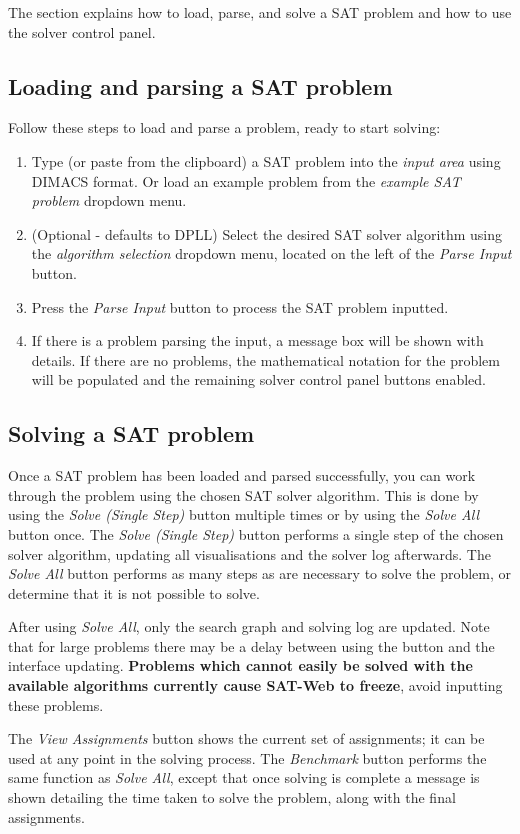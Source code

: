 \documentclass[UKenglish,a4paper]{article}
\begin{document}
The section explains how to load, parse, and solve a SAT problem and how to use the solver control panel.

\subsection{Loading and parsing a SAT problem}

Follow these steps to load and parse a problem, ready to start solving:

\begin{enumerate}
  \item Type (or paste from the clipboard) a SAT problem into the \emph{input area} using DIMACS format. Or load an example problem from the \emph{example SAT problem} dropdown menu.
  \item (Optional - defaults to DPLL) Select the desired SAT solver algorithm using the \emph{algorithm selection} dropdown menu, located on the left of the \emph{Parse Input} button.
  \item Press the \emph{Parse Input} button to process the SAT problem inputted.
  \item If there is a problem parsing the input, a message box will be shown with details. If there are no problems, the mathematical notation for the problem will be populated and the remaining solver control panel buttons enabled.
\end{enumerate}

\subsection{Solving a SAT problem}

Once a SAT problem has been loaded and parsed successfully, you can work through the problem using the chosen SAT solver algorithm. This is done by using the \emph{Solve (Single Step)} button multiple times or by using the \emph{Solve All} button once. The \emph{Solve (Single Step)} button performs a single step of the chosen solver algorithm, updating all visualisations and the solver log afterwards. The \emph{Solve All} button performs as many steps as are necessary to solve the problem, or determine that it is not possible to solve.

After using \emph{Solve All}, only the search graph and solving log are updated. Note that for large problems there may be a delay between using the button and the interface updating. \textbf{Problems which cannot easily be solved with the available algorithms currently cause SAT-Web to freeze}, avoid inputting these problems.

The \emph{View Assignments} button shows the current set of assignments; it can be used at any point in the solving process. The \emph{Benchmark} button performs the same function as \emph{Solve All}, except that once solving is complete a message is shown detailing the time taken to solve the problem, along with the final assignments.

\end{document}
